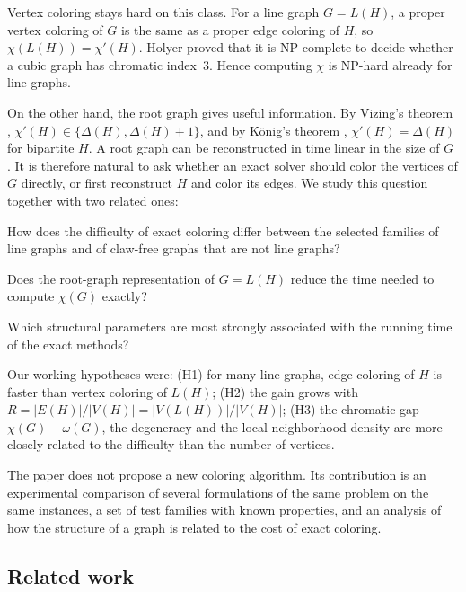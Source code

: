 \documentclass[11pt,a4paper]{article}
\begin{document}
Vertex coloring stays hard on this class. For a line graph $G=L(H)$, a proper
vertex coloring of $G$ is the same as a proper edge coloring of $H$, so
$\chi(L(H))=\chi'(H)$. Holyer \cite{holyer1981} proved that it is NP-complete to
decide whether a cubic graph has chromatic index~$3$. Hence computing $\chi$ is
NP-hard already for line graphs.

On the other hand, the root graph gives useful information. By Vizing's
theorem \cite{vizing1964}, $\chi'(H)\in\{\Delta(H),\Delta(H)+1\}$, and by
K\"onig's theorem \cite{konig1916}, $\chi'(H)=\Delta(H)$ for bipartite $H$. A
root graph can be reconstructed in time linear in the size of $G$
\cite{roussopoulos1973,liu2015}. It is therefore natural to ask whether an
exact solver should color the vertices of $G$ directly, or first reconstruct
$H$ and color its edges. We study this question together with two related
ones:
\begin{description}\setlength{\itemsep}{1pt}
\item[RQ1.] How does the difficulty of exact coloring differ between the
selected families of line graphs and of claw-free graphs that are not line
graphs?
\item[RQ2.] Does the root-graph representation of $G=L(H)$ reduce the time
needed to compute $\chi(G)$ exactly?
\item[RQ3.] Which structural parameters are most strongly associated with the
running time of the exact methods?
\end{description}
Our working hypotheses were: (H1) for many line graphs, edge coloring of $H$ is
faster than vertex coloring of $L(H)$; (H2) the gain grows with
$R=|E(H)|/|V(H)|=|V(L(H))|/|V(H)|$; (H3) the chromatic gap $\chi(G)-\omega(G)$,
the degeneracy and the local neighborhood density are more closely related to
the difficulty than the number of vertices.

The paper does not propose a new coloring algorithm. Its contribution is an
experimental comparison of several formulations of the same problem on the same
instances, a set of test families with known properties, and an analysis of how
the structure of a graph is related to the cost of exact coloring.

\subsection{Related work}
\end{document}

